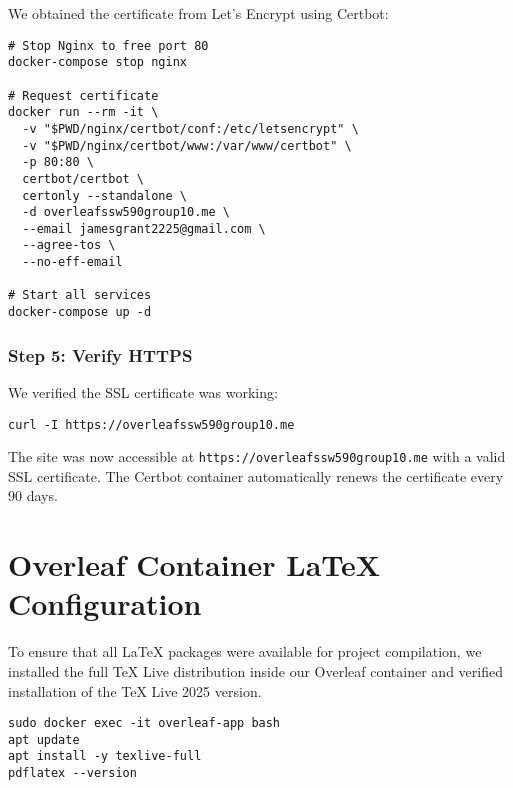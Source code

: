 We obtained the certificate from Let's Encrypt using Certbot:

\begin{verbatim}
# Stop Nginx to free port 80
docker-compose stop nginx

# Request certificate
docker run --rm -it \
  -v "$PWD/nginx/certbot/conf:/etc/letsencrypt" \
  -v "$PWD/nginx/certbot/www:/var/www/certbot" \
  -p 80:80 \
  certbot/certbot \
  certonly --standalone \
  -d overleafssw590group10.me \
  --email jamesgrant2225@gmail.com \
  --agree-tos \
  --no-eff-email

# Start all services
docker-compose up -d
\end{verbatim}

\subsubsection{Step 5: Verify HTTPS}

We verified the SSL certificate was working:

\begin{verbatim}
curl -I https://overleafssw590group10.me
\end{verbatim}

The site was now accessible at \texttt{https://overleafssw590group10.me} with a valid SSL certificate. The Certbot container automatically renews the certificate every 90 days.

\section{Overleaf Container LaTeX Configuration}
To ensure that all LaTeX packages were available for project compilation, we installed the full TeX Live distribution inside our Overleaf container and verified installation of the TeX Live 2025 version.

\begin{verbatim}
sudo docker exec -it overleaf-app bash
apt update
apt install -y texlive-full
pdflatex --version
\end{verbatim}


